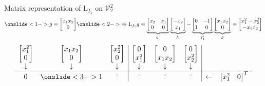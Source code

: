 \documentclass[10pt,T]{beamer}
\newcommand{\transparent}[1]{\textcolor{lightgray}{#1}}
\begin{document}
\begin{frame}[b]{Matrix representation of L$_{f_1}$ on $\mathcal{V}_2^2$}
\begin{equation*}
  \onslide<1->{g=\begin{bmatrix}x_1x_2\\0\end{bmatrix}}
  \onslide<2->{\Rightarrow\text{L}_{f_1}g=\underbrace{\begin{bmatrix}x_2&x_1\\0&0\end{bmatrix}}_{g'}\underbrace{\begin{bmatrix}-x_2\\x_1\end{bmatrix}}_{f_1}
    -\underbrace{\begin{bmatrix}0&-1\\1&0\end{bmatrix}}_{f_1'}\underbrace{\begin{bmatrix}x_1x_2\\0\end{bmatrix}}_{g}=\begin{bmatrix}x_1^2-x_2^2\\-x_1x_2\end{bmatrix}}
\end{equation*}
\begin{equation*}
  \begin{array}{ccc|ccc|cc}
    \begin{bmatrix}x_1^2\\0\end{bmatrix}&\begin{bmatrix}x_1x_2\\0\end{bmatrix}&\begin{bmatrix}x_2^2\\0\end{bmatrix}&\begin{bmatrix}0\\x_1^2\end{bmatrix}&\begin{bmatrix}0\\x_1x_2\end{bmatrix}&\begin{bmatrix}0\\x_2^2\end{bmatrix}&&\\
    \downarrow&\downarrow&\downarrow&\downarrow&\downarrow&\downarrow&&\\\hline
    0&\onslide<3->{1}&\transparent{?}&\transparent{?}&\transparent{?}&\transparent{?}&\leftarrow&\begin{bmatrix}x_1^2&0\end{bmatrix}^T\\

\end{array}
\end{equation*}
\end{frame}
\end{document}
